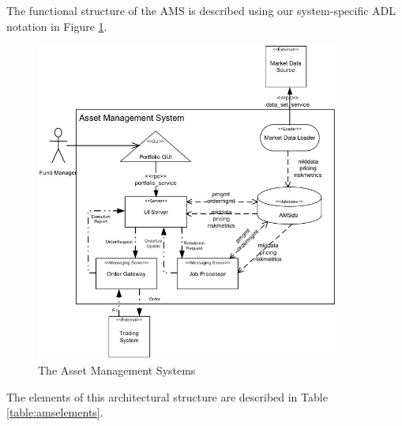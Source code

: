   The functional structure of the AMS is described using our system-specific ADL 
notation in Figure \ref{figure:amsdiagram}. 

\begin{figure}
\centering
\includegraphics[width=10cm]{Figures/adls-figure4}
\caption{The Asset Management Systems}
\label{figure:amsdiagram}
\end{figure}  

The elements of this architectural structure are described in Table \ref{table:amselements}. 
  
